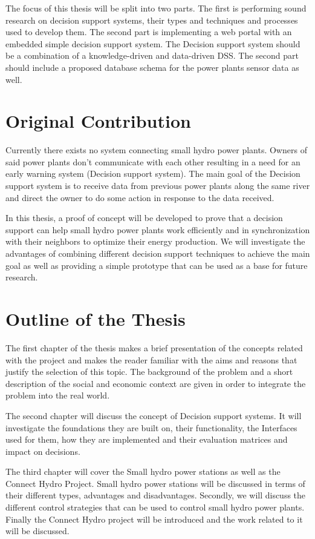 The focus of this thesis will be split into two parts. The first is performing sound research on decision support systems, their types and techniques and processes used to develop them. The second part is implementing a web portal with an embedded simple decision support system. The Decision support system should be a combination of a knowledge-driven and data-driven DSS. The second part should include a proposed database schema for the power plants sensor data as well.
\section{Original Contribution}
\label{sec:OriginalContribution}
Currently there exists no system connecting small hydro power plants. Owners of said power plants don't communicate with each other resulting in a need for an early warning system (Decision support system). The main goal of the Decision support system is to receive data from previous power plants along the same river and direct the owner to do some action in response to the data received.

In this thesis, a proof of concept will be developed to prove that a decision support can help small hydro power plants work efficiently and in synchronization with their neighbors to optimize their energy production. We will investigate the advantages of combining different decision support techniques to achieve the main goal as well as providing a simple prototype that can be used as a base for future research.
\section{Outline of the Thesis}
\label{sec:OutlineOfTheThesis}
The first chapter of the thesis makes a brief presentation of the concepts related with the project and makes the reader familiar with the aims and reasons that justify the selection of this topic. The background of the problem and a short description of the social and economic context are given in order to integrate the problem into the real world.

\indent The second chapter will discuss the concept of Decision support systems. It will investigate the foundations they are built on, their functionality, the Interfaces used for them, how they are implemented and their evaluation matrices and impact on decisions.

\indent The third chapter will cover the Small hydro power stations as well as the Connect Hydro Project. Small hydro power stations will be discussed in terms of their different types, advantages and disadvantages. Secondly, we will discuss the different control strategies that can be used to control small hydro power plants. Finally the Connect Hydro project will be introduced and the work related to it will be discussed.

